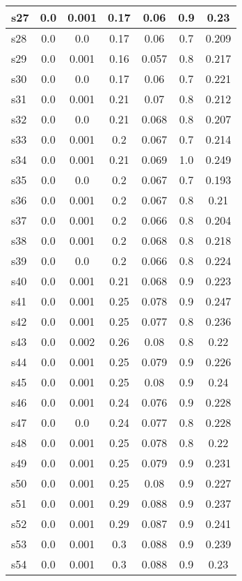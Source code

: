 \documentclass{article}
\begin{document}
\begin{tabular}{|l|c|c|c|c|c|c|}
\hline
s27 &0.0 & 0.001 & 0.17 & 0.06 & 0.9 & 0.23\\
\hline
s28 &0.0 & 0.0 & 0.17 & 0.06 & 0.7 & 0.209\\
\hline
s29 &0.0 & 0.001 & 0.16 & 0.057 & 0.8 & 0.217\\
\hline
s30 &0.0 & 0.0 & 0.17 & 0.06 & 0.7 & 0.221\\
\hline
s31 &0.0 & 0.001 & 0.21 & 0.07 & 0.8 & 0.212\\
\hline
s32 &0.0 & 0.0 & 0.21 & 0.068 & 0.8 & 0.207\\
\hline
s33 &0.0 & 0.001 & 0.2 & 0.067 & 0.7 & 0.214\\
\hline
s34 &0.0 & 0.001 & 0.21 & 0.069 & 1.0 & 0.249\\
\hline
s35 &0.0 & 0.0 & 0.2 & 0.067 & 0.7 & 0.193\\
\hline
s36 &0.0 & 0.001 & 0.2 & 0.067 & 0.8 & 0.21\\
\hline
s37 &0.0 & 0.001 & 0.2 & 0.066 & 0.8 & 0.204\\
\hline
s38 &0.0 & 0.001 & 0.2 & 0.068 & 0.8 & 0.218\\
\hline
s39 &0.0 & 0.0 & 0.2 & 0.066 & 0.8 & 0.224\\
\hline
s40 &0.0 & 0.001 & 0.21 & 0.068 & 0.9 & 0.223\\
\hline
s41 &0.0 & 0.001 & 0.25 & 0.078 & 0.9 & 0.247\\
\hline
s42 &0.0 & 0.001 & 0.25 & 0.077 & 0.8 & 0.236\\
\hline
s43 &0.0 & 0.002 & 0.26 & 0.08 & 0.8 & 0.22\\
\hline
s44 &0.0 & 0.001 & 0.25 & 0.079 & 0.9 & 0.226\\
\hline
s45 &0.0 & 0.001 & 0.25 & 0.08 & 0.9 & 0.24\\
\hline
s46 &0.0 & 0.001 & 0.24 & 0.076 & 0.9 & 0.228\\
\hline
s47 &0.0 & 0.0 & 0.24 & 0.077 & 0.8 & 0.228\\
\hline
s48 &0.0 & 0.001 & 0.25 & 0.078 & 0.8 & 0.22\\
\hline
s49 &0.0 & 0.001 & 0.25 & 0.079 & 0.9 & 0.231\\
\hline
s50 &0.0 & 0.001 & 0.25 & 0.08 & 0.9 & 0.227\\
\hline
s51 &0.0 & 0.001 & 0.29 & 0.088 & 0.9 & 0.237\\
\hline
s52 &0.0 & 0.001 & 0.29 & 0.087 & 0.9 & 0.241\\
\hline
s53 &0.0 & 0.001 & 0.3 & 0.088 & 0.9 & 0.239\\
\hline
s54 &0.0 & 0.001 & 0.3 & 0.088 & 0.9 & 0.23\\

\end{tabular}
\end{document}
